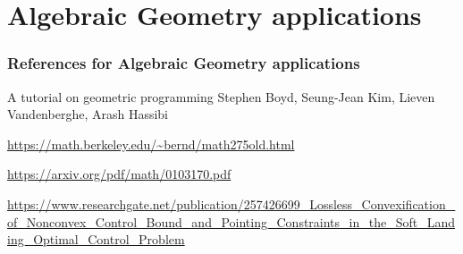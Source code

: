 \part{Algebraic Geometry applications}


\section{References for Algebraic Geometry applications}

 A tutorial on geometric programming
	Stephen Boyd, Seung-Jean Kim, Lieven Vandenberghe, Arash Hassibi

\url{https://math.berkeley.edu/~bernd/math275old.html}

\url{https://arxiv.org/pdf/math/0103170.pdf}

\url{https://www.researchgate.net/publication/257426699_Lossless_Convexification_of_Nonconvex_Control_Bound_and_Pointing_Constraints_in_the_Soft_Landing_Optimal_Control_Problem}




